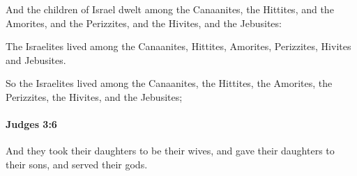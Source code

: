 			\begin{versebox}
					\item[BHS] 
					\item[ASV] And the children of Israel dwelt among the Canaanites, the Hittites, and the Amorites, and the Perizzites, and the Hivites, and the Jebusites:
					\item[NIV] The Israelites lived among the Canaanites, Hittites, Amorites, Perizzites, Hivites and Jebusites.
					\item[NRSV] So the Israelites lived among the Canaanites, the Hittites, the Amorites, the Perizzites, the Hivites, and the Jebusites;
			\end{versebox}

		\paragraph{Judges 3:6} %
			\label{JUDGES-3-6}

			And they took their daughters to be their wives, and gave their daughters to their sons, and served their gods.

